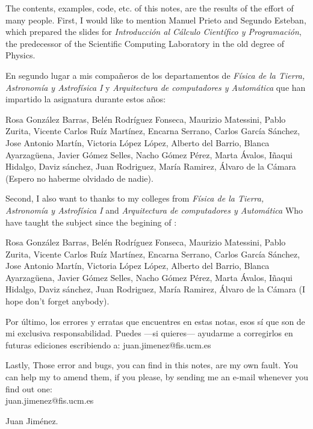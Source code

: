 \begin{paracol}{2}
\switchcolumn
The contents, examples, code, etc. of this notes, are the results of the effort of many people. First, I would like to mention  Manuel Prieto and Segundo Esteban, which prepared the slides for \emph{Introducción al Cálculo Científico y Programación}, the predecessor of the Scientific Computing Laboratory in the old degree of Physics.  

\switchcolumn
En segundo lugar a mis compañeros de los departamentos de  \emph{Física de la Tierra, Astronomía y Astrofísica I} y  \emph{Arquitectura de computadores y Automática} que han impartido la asignatura durante estos años: 

Rosa González Barras, Belén Rodríguez Fonseca, Maurizio Matessini, Pablo Zurita, Vicente Carlos Ruíz Martínez, Encarna Serrano, Carlos García Sánchez, Jose Antonio Martín, Victoria López López,  Alberto del Barrio, Blanca Ayarzagüena, Javier Gómez Selles, Nacho Gómez Pérez, Marta Ávalos, Iñaqui Hidalgo, Daviz sánchez,  Juan Rodriguez, María Ramirez, Álvaro de la Cámara (Espero no haberme olvidado de nadie).

\switchcolumn
Second, I also want to thanks to my colleges from \emph{Física de la Tierra, Astronomía y Astrofísica I} and  \emph{Arquitectura de computadores y Automática} Who have taught the subject since the begining of : 

Rosa González Barras, Belén Rodríguez Fonseca, Maurizio Matessini, Pablo Zurita, Vicente Carlos Ruíz Martínez, Encarna Serrano, Carlos García Sánchez, Jose Antonio Martín, Victoria López López,  Alberto del Barrio, Blanca Ayarzagüena, Javier Gómez Selles, Nacho Gómez Pérez, Marta Ávalos, Iñaqui Hidalgo, Daviz sánchez,  Juan Rodriguez, María Ramirez, Álvaro de la Cámara (I hope don't forget anybody).

\switchcolumn
Por último, los errores y erratas que encuentres en estas notas, esos sí que son de mi exclusiva responsabilidad.  Puedes ---si quieres--- ayudarme a corregirlos en futuras ediciones escribiendo a: juan.jimenez@fis.ucm.es 

\switchcolumn
Lastly, Those error and bugs, you can find in this notes, are my own fault. You can help my to amend them, if you please, by sending me an e-mail whenever you find out one:\\ juan.jimenez@fis.ucm.es 
\end{paracol}

\begin{flushright}
Juan Jiménez.
\end{flushright}

